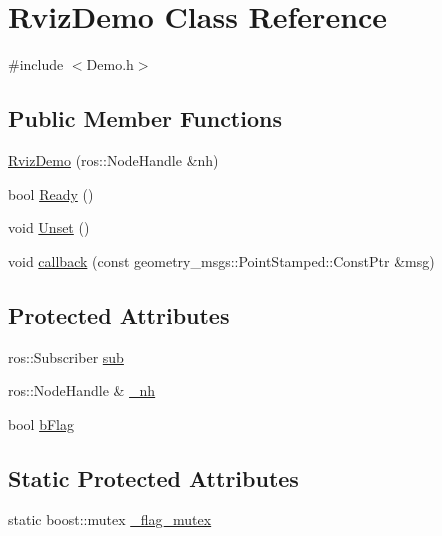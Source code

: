 \hypertarget{classRvizDemo}{\section{Rviz\-Demo Class Reference}
\label{classRvizDemo}
}


{\ttfamily \#include $<$Demo.\-h$>$}

\subsection*{Public Member Functions}
\begin{DoxyCompactItemize}
\item 
\hyperlink{classRvizDemo_a36e6ed2ae50852b13def36b58deedbc1}{Rviz\-Demo} (ros\-::\-Node\-Handle \&nh)
\item 
bool \hyperlink{classRvizDemo_af11434c2365d0ad9a7c4f1ba81327f49}{Ready} ()
\item 
void \hyperlink{classRvizDemo_abc8d8dce2484e9c932d9b42ce60080e1}{Unset} ()
\item 
void \hyperlink{classRvizDemo_a71d08ff849dcfab2acdedd88268ffef6}{callback} (const geometry\-\_\-msgs\-::\-Point\-Stamped\-::\-Const\-Ptr \&msg)
\end{DoxyCompactItemize}
\subsection*{Protected Attributes}
\begin{DoxyCompactItemize}
\item 
ros\-::\-Subscriber \hyperlink{classRvizDemo_a47f574e38565699efdb24fc628722716}{sub}
\item 
ros\-::\-Node\-Handle \& \hyperlink{classRvizDemo_afbd5562859f25a7747968cd9375bb3d7}{\-\_\-nh}
\item 
bool \hyperlink{classRvizDemo_a559916f367fa110e12c09d370888925f}{b\-Flag}
\end{DoxyCompactItemize}
\subsection*{Static Protected Attributes}
\begin{DoxyCompactItemize}
\item 
static boost\-::mutex \hyperlink{classRvizDemo_a91fefdf56048c3f7c9a9391e80e06f21}{\-\_\-flag\-\_\-mutex}
\end{DoxyCompactItemize}


